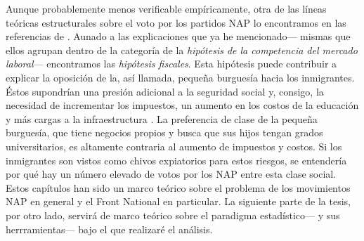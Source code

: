 Aunque probablemente menos verificable empíricamente, otra de las líneas teóricas estructurales sobre el voto por los partidos NAP lo encontramos en las referencias de \textcite{Valentino13}. Aunado a las explicaciones que ya he mencionado--- mismas que ellos agrupan dentro de la categoría de la \textit{hipótesis de la competencia del mercado laboral}--- encontramos las \textit{hipótesis fiscales}. Esta hipótesis puede contribuir a explicar la oposición de la, así llamada, pequeña burguesía hacia los inmigrantes. Éstos supondrían una presión adicional a la seguridad social y, consigo, la necesidad de incrementar los impuestos, un aumento en los costos de la educación y más cargas a la infraestructura \parencite[150]{Valentino13}. La preferencia de clase de la pequeña burguesía, que tiene negocios propios y busca que sus hijos tengan grados universitarios, es altamente contraria al aumento de impuestos y costos. Si los inmigrantes son vistos como chivos expiatorios para estos riesgos, se entendería por qué hay un número elevado de votos por los NAP entre esta clase social.\\

Estos capítulos han sido un marco teórico sobre el problema de los movimientos NAP en general y el Front National en particular. La siguiente parte de la tesis, por otro lado, servirá de marco teórico sobre el paradigma estadístico--- y sus herrramientas--- bajo el que realizaré el análisis.  